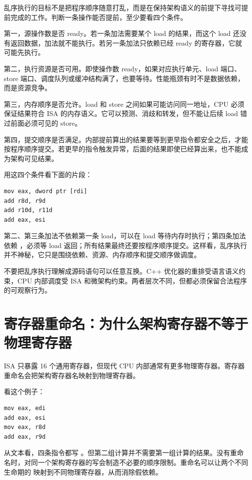 乱序执行的目标不是把程序顺序随意打乱，而是在保持架构语义的前提下寻找可提前完成的工作。判断一条操作能否提前，至少要看四个条件。

第一，源操作数是否 ready。若一条加法需要某个 load 的结果，而这个 load 还没有返回数据，加法就不能执行。若另一条加法只依赖已经 ready 的寄存器，它就可能先执行。

第二，执行资源是否可用。即使操作数 ready，如果对应执行单元、load 端口、store 端口、调度队列或缓冲结构满了，也要等待。性能瓶颈有时不是数据依赖，而是资源竞争。

第三，内存顺序是否允许。load 和 store 之间如果可能访问同一地址，CPU 必须保证结果符合 ISA 的内存语义。它可以预测、消歧和转发，但不能让后续 load 错过前面必须可见的 store。

第四，提交顺序是否满足。内部提前算出的结果要等到更早指令都安全之后，才能按程序顺序提交。若更早的指令触发异常，后面的结果即使已经算出来，也不能成为架构可见结果。

用这四个条件看下面的片段：

\begin{lstlisting}
mov eax, dword ptr [rdi]
add r8d, r9d
add r10d, r11d
add eax, esi
\end{lstlisting}

第二、第三条加法不依赖第一条 load，可以在 load 等待内存时执行；第四条加法依赖 ，必须等 load 返回；所有结果最终还要按程序顺序提交。这样看，乱序执行并不神秘，它只是围绕依赖、资源、内存顺序和提交顺序做调度。

\begin{warningbox}
不要把乱序执行理解成源码语句可以任意互换。C++ 优化器的重排受语言语义约束，CPU 内部调度受 ISA 和微架构约束。两者层次不同，但都必须保留合法程序的可观察行为。
\end{warningbox}

\section{寄存器重命名：为什么架构寄存器不等于物理寄存器}

ISA 只暴露 16 个通用寄存器，但现代 CPU 内部通常有更多物理寄存器。寄存器重命名会把架构寄存器名映射到物理寄存器。

看这个例子：

\begin{lstlisting}
mov eax, edi
add eax, esi
mov eax, r8d
add eax, r9d
\end{lstlisting}

从文本看，四条指令都写 。但第二组计算并不需要第一组计算的结果。没有重命名时，对同一个架构寄存器的写会制造不必要的顺序限制。重命名可以让两个不同生命期的  映射到不同物理寄存器，从而消除假依赖。


